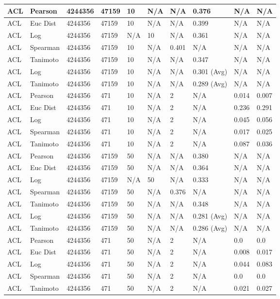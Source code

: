 \documentclass{article}
\begin{document}
\begin{longtable}{ |p{1.7cm}|p{1.9cm}|p{1.5cm}|p{1.5cm}|p{0.75cm}|p{0.75cm}|p{0.75cm}|p{0.75cm}|p{1.5cm}|p{1.5cm}|}
    ACL & Pearson & 4244356 & 47159 & 10 & N/A & N/A & 0.376 & N/A & N/A  \\ \hline
    ACL & Euc Dist & 4244356 & 47159 & 10 & N/A & N/A & 0.399 & N/A & N/A   \\ \hline
    ACL & Log & 4244356 & 47159 & N/A &  10 & N/A& 0.361 & N/A & N/A  \\ \hline
    ACL & Spearman & 4244356 & 47159 & 10 & N/A & 0.401 & N/A & N/A & N/A \\ \hline
    ACL & Tanimoto & 4244356 & 47159 & 10 & N/A& N/A & 0.347 & N/A & N/A \\ \hline
    ACL & Log & 4244356 & 47159 & 10 & N/A& N/A & 0.301 (Avg) & N/A & N/A \\ \hline
    ACL & Tanimoto & 4244356 & 47159 & 10 & N/A & N/A & 0.289 (Avg) & N/A & N/A \\ \hline
    
    ACL  & Pearson & 4244356 & 471 & 10 & N/A  & 2 & N/A & 0.014 & 0.007  \\ \hline
    ACL  & Euc Dist & 4244356 & 471 & 10 & N/A  & 2 & N/A &0.236 & 0.291   \\ \hline
    ACL  & Log & 4244356 & 471 & 10 & N/A & 2 & N/A & 0.045 & 0.056  \\ \hline
    ACL  & Spearman & 4244356 & 471 & 10 & N/A  & 2 & N/A &0.017 & 0.025 \\ \hline
    ACL  & Tanimoto & 4244356 & 471 & 10 & N/A  & 2 & N/A & 0.087 & 0.036 \\ \hline
    
    ACL & Pearson & 4244356 & 47159 & 50 & N/A & N/A & 0.380 & N/A & N/A  \\ \hline
    ACL & Euc Dist & 4244356 & 47159 & 50 & N/A & N/A & 0.364 & N/A & N/A   \\ \hline
    ACL & Log & 4244356 & 47159 & N/A &  50 & N/A& 0.333 & N/A & N/A  \\ \hline
    ACL & Spearman & 4244356 & 47159 & 50 & N/A & 0.376 & N/A & N/A & N/A \\ \hline
    ACL & Tanimoto & 4244356 & 47159 & 50 & N/A& N/A & 0.348 & N/A & N/A \\ \hline
    ACL & Log & 4244356 & 47159 & 50 & N/A& N/A & 0.281 (Avg) & N/A & N/A \\ \hline
    ACL & Tanimoto & 4244356 & 47159 & 50 & N/A & N/A & 0.286 (Avg) & N/A & N/A \\ \hline
    
    ACL  & Pearson & 4244356 & 471 & 50 & N/A  & 2 & N/A & 0.0 & 0.0  \\ \hline
    ACL  & Euc Dist & 4244356 & 471 & 50 & N/A  & 2 & N/A &0.008 & 0.017   \\ \hline
    ACL  & Log & 4244356 & 471 & 50 & N/A & 2 & N/A & 0.044 & 0.083  \\ \hline
    ACL  & Spearman & 4244356 & 471 & 50 & N/A  & 2 & N/A &0.0 & 0.0 \\ \hline
    ACL  & Tanimoto & 4244356 & 471 & 50 & N/A  & 2 & N/A & 0.021 & 0.027 \\ \hline


\end{longtable}
\end{document}
